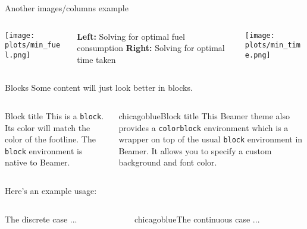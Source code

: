 \documentclass{beamer}
\begin{document}
\begin{frame}{Another images/columns example}
\begin{columns}
\begin{column}{0.35\textwidth}
\texttt{[image: plots/min\_fuel.png]}
\end{column}
\begin{column}{0.3\textwidth}
\textbf{Left:} Solving for optimal fuel consumption \textbf{Right:} Solving for optimal time taken
\end{column}
\begin{column}{0.35\textwidth}
\texttt{[image: plots/min\_time.png]}
\end{column}
\end{columns}
\end{frame}


\begin{frame}{Blocks}
Some content will just look better in blocks.
\begin{columns}
\begin{column}{0.4\textwidth}
\begin{block}{Block title}
This is a \texttt{block}. Its color will match the color of the footline. The \texttt{block} environment is native to Beamer.
\end{block}
\end{column}
\begin{column}{0.6\textwidth}
\begin{colorblock}[black]{chicagoblue}{Block title}
This Beamer theme also provides a \texttt{colorblock} environment which is a wrapper on top of the usual \texttt{block} environment in Beamer. It allows you to specify a custom background and font color.
\end{colorblock}
\end{column}
\end{columns}

\vspace{3ex}
Here's an example usage:

\begin{columns}
\begin{column}{0.5\textwidth}
\begin{block}{The discrete case}
...
\end{block}
\end{column}
\begin{column}{0.5\textwidth}
\begin{colorblock}[black]{chicagoblue}{The continuous case}
...
\end{colorblock}
\end{column}
\end{columns}
\end{frame}
\end{document}
